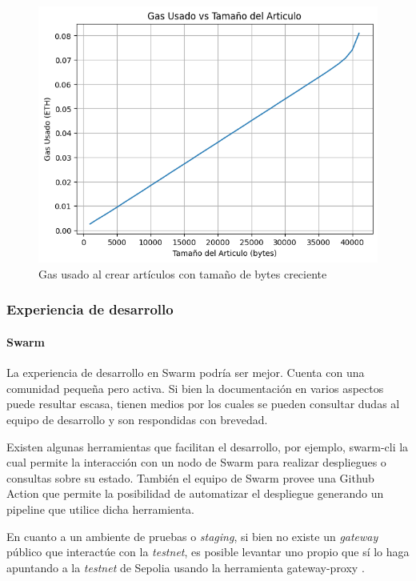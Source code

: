 \begin{figure}[H]
    \centering
    \includegraphics[width=0.75\linewidth]{img/aw-eth-bytes-articulo-incremental-gas.png}
    \caption{Gas usado al crear artículos con tamaño de bytes creciente}
    \label{fig:aw-eth-bytes-articulo-incremental-gas}
\end{figure}

\subsubsection{Experiencia de desarrollo} %

\paragraph{Swarm}
La experiencia de desarrollo en Swarm podría ser mejor. Cuenta con una comunidad pequeña pero activa. Si bien la documentación en varios aspectos puede resultar escasa, tienen medios por los cuales se pueden consultar dudas al equipo de desarrollo y son respondidas con brevedad.

Existen algunas herramientas que facilitan el desarrollo, por ejemplo, swarm-cli \cite{swarm-cli} la cual permite la interacción con un nodo de Swarm para realizar despliegues o consultas sobre su estado. También el equipo de Swarm provee una Github Action que permite la posibilidad de automatizar el despliegue generando un pipeline que utilice dicha herramienta.

En cuanto a un ambiente de pruebas o \textit{staging}, si bien no existe un \textit{gateway} público que interactúe con la \textit{testnet}, es posible levantar uno propio que sí lo haga apuntando a la \textit{testnet} de Sepolia usando la herramienta gateway-proxy \cite{gateway-proxy}.

